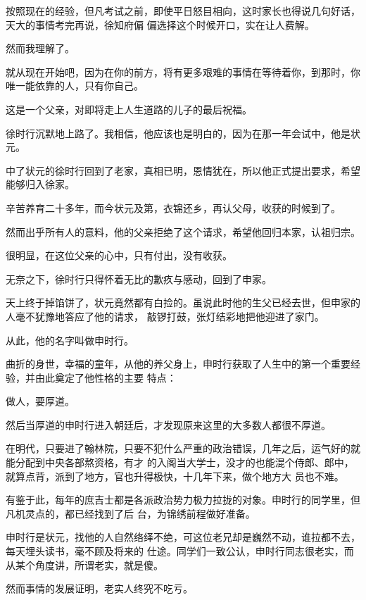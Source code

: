 \documentclass[11pt,a4paper,onecolumn]{article}
\begin{document}
按照现在的经验，但凡考试之前，即使平日怒目相向，这时家长也得说几句好话，天大的事情考完再说，徐知府偏
偏选择这个时候开口，实在让人费解。

然而我理解了。

就从现在开始吧，因为在你的前方，将有更多艰难的事情在等待着你，到那时，你唯一能依靠的人，只有你自己。

这是一个父亲，对即将走上人生道路的儿子的最后祝福。

徐时行沉默地上路了。我相信，他应该也是明白的，因为在那一年会试中，他是状元。

中了状元的徐时行回到了老家，真相已明，恩情犹在，所以他正式提出要求，希望能够归入徐家。

辛苦养育二十多年，而今状元及第，衣锦还乡，再认父母，收获的时候到了。

然而出乎所有人的意料，他的父亲拒绝了这个请求，希望他回归本家，认祖归宗。

很明显，在这位父亲的心中，只有付出，没有收获。

无奈之下，徐时行只得怀着无比的歉疚与感动，回到了申家。

天上终于掉馅饼了，状元竟然都有白捡的。虽说此时他的生父已经去世，但申家的人毫不犹豫地答应了他的请求，
敲锣打鼓，张灯结彩地把他迎进了家门。

从此，他的名字叫做申时行。

曲折的身世，幸福的童年，从他的养父身上，申时行获取了人生中的第一个重要经验，并由此奠定了他性格的主要
特点：

做人，要厚道。

然后当厚道的申时行进入朝廷后，才发现原来这里的大多数人都很不厚道。

在明代，只要进了翰林院，只要不犯什么严重的政治错误，几年之后，运气好的就能分配到中央各部熬资格，有才
的入阁当大学士，没才的也能混个侍郎、郎中，就算点背，派到了地方，官也升得极快，十几年下来，做个地方大
员也不难。

有鉴于此，每年的庶吉士都是各派政治势力极力拉拢的对象。申时行的同学里，但凡机灵点的，都已经找到了后
台，为锦绣前程做好准备。

申时行是状元，找他的人自然络绎不绝，可这位老兄却是巍然不动，谁拉都不去，每天埋头读书，毫不顾及将来的
仕途。同学们一致公认，申时行同志很老实，而从某个角度讲，所谓老实，就是傻。

然而事情的发展证明，老实人终究不吃亏。

\section[\thesection]{}
\end{document}
